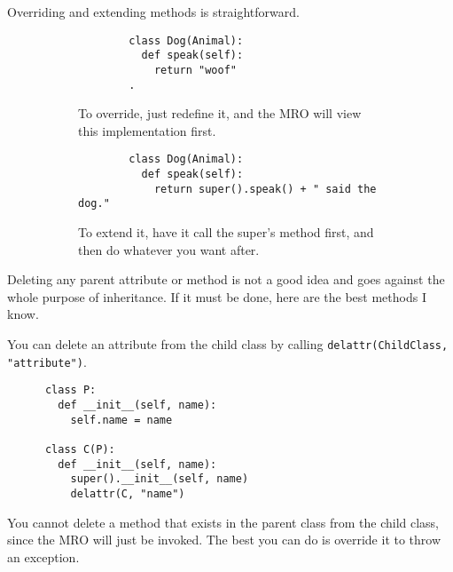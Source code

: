   Overriding and extending methods is straightforward. 

  \begin{figure}[H]
    \centering
    \begin{subfigure}[b]{0.48\textwidth}
      \centering
      \begin{lstlisting}
        class Dog(Animal): 
          def speak(self): 
            return "woof"
        .
      \end{lstlisting}
      \caption{To override, just redefine it, and the MRO will view this implementation first.}
    \end{subfigure}
    \hfill 
    \begin{subfigure}[b]{0.48\textwidth}
      \centering
      \begin{lstlisting}
        class Dog(Animal): 
          def speak(self): 
            return super().speak() + " said the dog."
      \end{lstlisting}
      \caption{To extend it, have it call the super's method first, and then do whatever you want after. }
    \end{subfigure}
    \caption{}
  \end{figure}

  Deleting any parent attribute or method is not a good idea and goes against the whole purpose of inheritance. If it must be done, here are the best methods I know. 

  \begin{theorem}
    You can delete an attribute from the child class by calling \texttt{delattr(ChildClass, "attribute")}. 
    \begin{lstlisting}
      class P: 
        def __init__(self, name): 
          self.name = name  

      class C(P): 
        def __init__(self, name): 
          super().__init__(self, name) 
          delattr(C, "name") 
    \end{lstlisting}
  \end{theorem}

  \begin{theorem}
    You cannot delete a method that exists in the parent class from the child class, since the MRO will just be invoked. The best you can do is override it to throw an exception. 
  \end{theorem}

